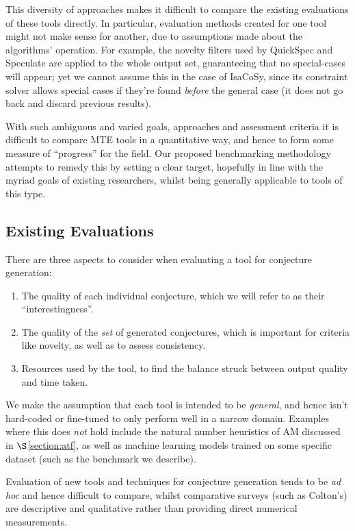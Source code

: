 This diversity of approaches makes it difficult to compare the existing
evaluations of these tools directly. In particular, evaluation methods created
for one tool might not make sense for another, due to assumptions made about
the algorithms' operation. For example, the novelty filters used by QuickSpec
and Speculate are applied to the whole output set, guaranteeing that no
special-cases will appear; yet we cannot assume this in the case of IsaCoSy,
since its constraint solver allows special cases if they're found \emph{before}
the general case (it does not go back and discard previous results).

With such ambiguous and varied goals, approaches and assessment criteria it is
difficult to compare MTE tools in a quantitative way, and hence to form some
measure of ``progress'' for the field. Our proposed benchmarking methodology
attempts to remedy this by setting a clear target, hopefully in line with the
myriad goals of existing researchers, whilst being generally applicable to
tools of this type.

\subsection{Existing Evaluations}
\label{sec:existing}

There are three aspects to consider when evaluating a tool for conjecture
generation:

\begin{enumerate}
\item The quality of each individual conjecture, which we will refer to as their
  ``interestingness''.
\item The quality of the \emph{set} of generated conjectures, which is important
  for criteria like novelty, as well as to assess consistency.
\item Resources used by the tool, to find the balance struck between output
  quality and time taken.
\end{enumerate}

We make the assumption that each tool is intended to be \emph{general}, and
hence isn't hard-coded or fine-tuned to only perform well in a narrow domain.
Examples where this does \emph{not} hold include the natural number heuristics
of AM discussed in $\S$\ref{section:atf}, as well as machine learning models
trained on some specific dataset (such as the benchmark we describe).

Evaluation of new tools and techniques for conjecture generation tends to be
\emph{ad hoc} and hence difficult to compare, whilst comparative surveys (such
as Colton's) are descriptive and qualitative rather than providing direct
numerical measurements.

